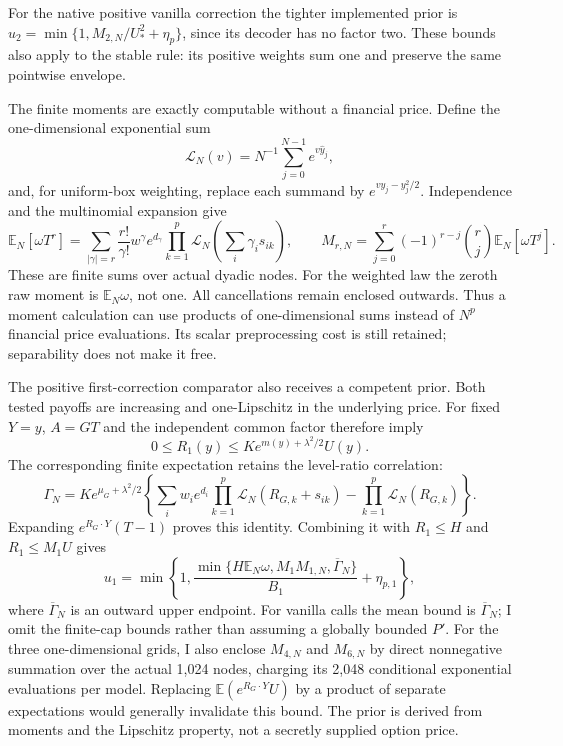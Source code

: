 \documentclass[11pt]{article}
\newcommand{\E}{\mathbb E}
\begin{document}
For the native positive vanilla correction the tighter implemented prior is
$u_2=\min\{1,M_{2,N}/U_*^2+\eta_p\}$, since its decoder has no factor two.
These bounds also apply to the stable rule: its positive weights sum one
and preserve the same pointwise envelope.

The finite moments are exactly computable without a financial price.
Define the one-dimensional exponential sum
\begin{equation}
 \mathcal L_N(v)=N^{-1}\sum_{j=0}^{N-1}e^{v\widehat y_j},
 \label{eq:finite-mgf}
\end{equation}
and, for uniform-box weighting, replace each summand by
$e^{vy_j-y_j^2/2}$.  Independence and the multinomial expansion give
\begin{equation}
 \E_N[\omega T^r]=
 \sum_{|\gamma|=r}\frac{r!}{\gamma!}w^\gamma e^{d_\gamma}
 \prod_{k=1}^p\mathcal L_N\!\left(\sum_i\gamma_is_{ik}\right),\qquad
 M_{r,N}=\sum_{j=0}^r(-1)^{r-j}\binom rj\E_N[\omega T^j].
 \label{eq:finite-moment}
\end{equation}
These are finite sums over actual dyadic nodes.
For the weighted law the zeroth raw moment is $\E_N\omega$, not one.
All cancellations remain enclosed outwards.
Thus a moment calculation can use products of one-dimensional sums instead
of $N^p$ financial price evaluations.  Its scalar preprocessing cost is
still retained; separability does not make it free.

The positive first-correction comparator also receives a competent prior.
Both tested payoffs are increasing and one-Lipschitz in the underlying price.
For fixed $Y=y$, $A=GT$ and the independent common factor therefore imply
\begin{equation}
 0\leq R_1(y)\leq Ke^{m(y)+\lambda^2/2}U(y).
 \label{eq:underlying-gap}
\end{equation}
The corresponding finite expectation retains the level-ratio correlation:
\begin{equation}
 \Gamma_N=Ke^{\mu_G+\lambda^2/2}
 \left\{\sum_iw_ie^{d_i}\prod_{k=1}^p\mathcal L_N(R_{G,k}+s_{ik})
       -\prod_{k=1}^p\mathcal L_N(R_{G,k})\right\}.
 \label{eq:correlated-gap}
\end{equation}
Expanding $e^{R_G\cdot Y}(T-1)$ proves this identity.
Combining it with $R_1\leq H$ and $R_1\leq M_1U$ gives
\begin{equation}
 u_1=\min\left\{1,
 \frac{\min\{H\E_N\omega,M_1M_{1,N},\overline\Gamma_N\}}{B_1}
 +\eta_{p,1}\right\},
 \label{eq:first-prior}
\end{equation}
where $\overline\Gamma_N$ is an outward upper endpoint.
For vanilla calls the mean bound is $\overline\Gamma_N$; I omit the
finite-cap bounds rather than assuming a globally bounded $P'$.
For the three one-dimensional grids, I also enclose $M_{4,N}$ and $M_{6,N}$
by direct nonnegative summation over the actual 1,024 nodes, charging its
2,048 conditional exponential evaluations per model.
Replacing $\E(e^{R_G\cdot Y}U)$ by a product of separate expectations
would generally invalidate this bound.  The prior is derived from moments
and the Lipschitz property, not a secretly supplied option price.
\end{document}
